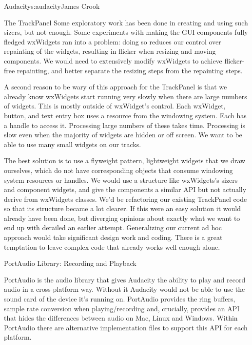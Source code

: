 \begin{aosachapter}{Audacity}{s:audacity}{James Crook}
\begin{aosasect1}{The TrackPanel}
Some exploratory work has been done in creating and using such sizers,
but not enough.  Some experiments with making the GUI components fully
fledged wxWidgets ran into a problem: doing so reduces our control
over repainting of the widgets, resulting in flicker when resizing and
moving components.  We would need to
extensively modify wxWidgets to achieve flicker-free repainting, and
better separate the resizing steps from the repainting steps.

A second reason to be wary of this approach for the TrackPanel is that
we already know wxWidgets start running very slowly when there are
large numbers of widgets.  This is mostly outside of wxWidget's
control.  Each wxWidget, button, and text entry box uses a
resource from the windowing system. Each has a handle to access it.
Processing large numbers of these takes time.  Processing is slow even
when the majority of widgets are hidden or off screen.  We want to be
able to use many small widgets on our tracks.

The best solution is to use a flyweight pattern, lightweight
widgets that we draw ourselves, which do not have corresponding
objects that consume windowing system resources or handles.  We would
use a structure like wxWidgets's sizers and component widgets, and
give the components a similar API but not actually derive from
wxWidgets classes.  We'd be refactoring our existing TrackPanel code
so that its structure became a lot clearer.  If this were an easy
solution it would already have been done, but diverging opinions about
exactly what we want to end up with derailed an earlier attempt.
Generalizing our current ad hoc approach would take significant design
work and coding.  There is a great temptation to leave complex code
that already works well enough alone.

\end{aosasect1}

\begin{aosasect1}{PortAudio Library: Recording and Playback}

PortAudio is the audio library that gives Audacity the ability to play
and record audio in a cross-platform way.  Without it Audacity would
not be able to use the sound card of the device it's running on.
PortAudio provides the ring
buffers, sample rate conversion when playing/recording and, crucially,
provides an API that hides the differences between audio on Mac, Linux
and Windows.  Within PortAudio there are alternative implementation
files to support this API for each platform.


\end{aosasect1}
\end{aosachapter}
